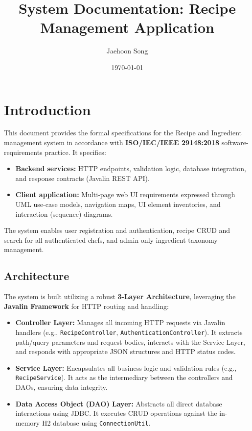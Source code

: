 \documentclass{article}
\title{System Documentation: Recipe Management Application}
\author{Jaehoon Song}
\date{\today}
\begin{document}
\maketitle

\section{Introduction}
This document provides the formal specifications for the Recipe and Ingredient management system in accordance with \textbf{ISO/IEC/IEEE 29148:2018} software-requirements practice. It specifies:
\begin{itemize}[noitemsep]
  \item \textbf{Backend services:} HTTP endpoints, validation logic, database integration, and response contracts (Javalin REST API).
  \item \textbf{Client application:} Multi-page web UI requirements expressed through UML use-case models, navigation maps, UI element inventories, and interaction (sequence) diagrams.
\end{itemize}
The system enables user registration and authentication, recipe CRUD and search for all authenticated chefs, and admin-only ingredient taxonomy management.

\subsection{Architecture}
The system is built utilizing a robust \textbf{3-Layer Architecture}, leveraging the \textbf{Javalin Framework} for HTTP routing and handling:
\begin{itemize}
    \item \textbf{Controller Layer:} Manages all incoming HTTP requests via Javalin handlers (e.g., \texttt{RecipeController}, \texttt{AuthenticationController}). It extracts path/query parameters and request bodies, interacts with the Service Layer, and responds with appropriate JSON structures and HTTP status codes.
    \item \textbf{Service Layer:} Encapsulates all business logic and validation rules (e.g., \texttt{RecipeService}). It acts as the intermediary between the controllers and DAOs, ensuring data integrity.
    \item \textbf{Data Access Object (DAO) Layer:} Abstracts all direct database interactions using JDBC. It executes CRUD operations against the in-memory H2 database using \texttt{ConnectionUtil}.
\end{itemize}
\end{document}
